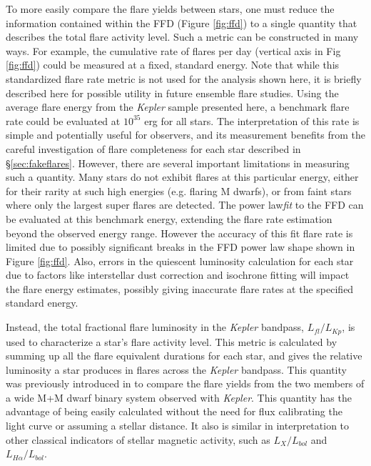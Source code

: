 \documentclass[twocolumn]{aastex6}
\newcommand{\Kepler}{\textsl{Kepler}\xspace}
\begin{document}
To more easily compare the flare yields between stars, one must reduce the information contained within the FFD (Figure \ref{fig:ffd}) to a single quantity that describes the total flare activity level. Such a metric can be constructed in many ways. For example, the cumulative rate of flares per day (vertical axis in Fig \ref{fig:ffd}) could be measured at a fixed, standard energy.  Note that while this standardized flare rate metric is not used for the analysis shown here, it is briefly described here for possible utility in future ensemble flare studies. 
Using the average flare energy from the \Kepler sample presented here, a benchmark flare rate could be evaluated at $10^{35}$ erg for all stars. The interpretation of this rate is simple and potentially useful for observers, and its measurement benefits from the careful investigation of flare completeness for each star described in \S\ref{sec:fakeflares}.
However, there are several important limitations in measuring such a quantity. Many stars do not exhibit flares at this particular energy, either for their rarity at such high energies (e.g. flaring M dwarfs), or from faint stars where only the largest super flares are detected. The power law{\it fit} to the FFD can be evaluated at this benchmark energy, extending the flare rate estimation beyond the observed energy range. However the accuracy of this fit flare rate is limited due to possibly significant breaks in the FFD power law shape shown in Figure \ref{fig:ffd}. Also, errors in the quiescent luminosity calculation for each star due to factors like interstellar dust correction and isochrone fitting will impact the flare energy estimates, possibly giving inaccurate flare rates at the specified standard energy.



Instead, the total fractional flare luminosity in the \Kepler bandpass, $L_{fl}/L_{Kp}$, is used to characterize a star's flare activity level. This metric is calculated by summing up all the flare equivalent durations for each star, and gives the relative luminosity a star produces in flares across the \Kepler bandpass. This quantity was previously introduced in \citet{lurie2015} to compare the flare yields from the two members of a wide M+M dwarf binary system observed with \Kepler. This quantity has the advantage of being easily calculated without the need for flux calibrating the light curve or assuming a stellar distance. It also is similar in interpretation to other classical indicators of stellar magnetic activity, such as $L_X/L_{bol}$ and $L_{H\alpha}/L_{bol}$.
\end{document}
